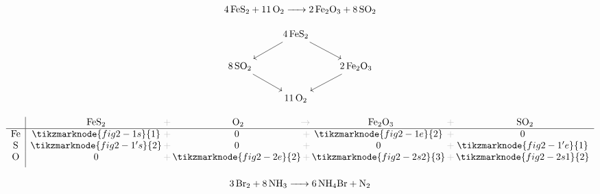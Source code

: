 \documentclass{ctexart}
\newcommand{\grayplus}{\,\color{lightgray}+\,}
\newcommand{\grayto}{\,\color{lightgray}\to\,}
\newcommand{\arrowLR}[3]{%
    \draw[->|,red,thick]
    ([xshift=2pt]#1.south east)
    .. controls ++(0.3cm,-0.2cm) and ++(-0.3cm,-0.2cm) ..
    ([xshift=-2pt]#2.south west)
    node[midway,below,blue,font=\small] {#3};
}
\newcommand{\arrowsToOneRL}[4]{%
    \draw[->,red,thick]
    ([xshift=-2pt]#1.south west)
    .. controls ++(-0.3cm,-0.2cm) and ++(0.3cm,-0.2cm) ..
    ([xshift=2pt]#3.south east)
    node[midway,below,blue,font=\small] {#4};
    \draw[->,red,thick]
    (#2.south)
    .. controls ++(-0.3cm,-0.2cm) and ++(0.3cm,-0.2cm) ..
    ([xshift=2pt]#3.south east);
}
\begin{document}
{    %

    \begin{center}
        \noindent
        \begin{minipage}[c]{0.4\textwidth}
            \[
                \ce{4FeS2 + 11O2 -> 2Fe2O3 + 8SO2}
            \]

            \[
                \begin{tikzcd}
                    & \ce{4FeS2} \arrow[dl] \arrow[dr] & \\
                    \ce{8SO2} \arrow[dr] & & \ce{2Fe2O3} \arrow[dl] \\
                    & \ce{11O2} &
                \end{tikzcd}
            \]
        \end{minipage}%
        \hspace{0.01\textwidth}
        \begin{minipage}[c]{0.4\textwidth}
            \[
                \begin{array}{c|*{3}{c@{\grayplus}}c}
                    & \multicolumn{1}{c@{\grayplus}}{\ce{FeS2}} &
                    \multicolumn{1}{c@{\grayto}}{\ce{O2}} &
                    \multicolumn{1}{c@{\grayplus}}{\ce{Fe2O3}} &
                    \multicolumn{1}{c}{\ce{SO2}} \\
                    \hline
                    \ce{Fe} & \tikzmarknode{fig2-1s}{1} & 0 &
                    \tikzmarknode{fig2-1e}{2} & 0\\
                    \ce{S} & \tikzmarknode{fig2-1's}{2} & 0 & 0 &
                    \tikzmarknode{fig2-1'e}{1}\\
                    \ce{O} & 0 & \tikzmarknode{fig2-2e}{2} &
                    \tikzmarknode{fig2-2s2}{3} &
                    \tikzmarknode{fig2-2s1}{2}\\[1ex]
                \end{array}
            \]
        \end{minipage}
    \end{center}

    \begin{center}
        \noindent
        \begin{minipage}[c]{0.4\textwidth}
            \[
                \ce{3 Br2 + 8 NH3 -> 6 NH4Br + N2}
            \]


\end{minipage}
\end{center}}
\end{document}
